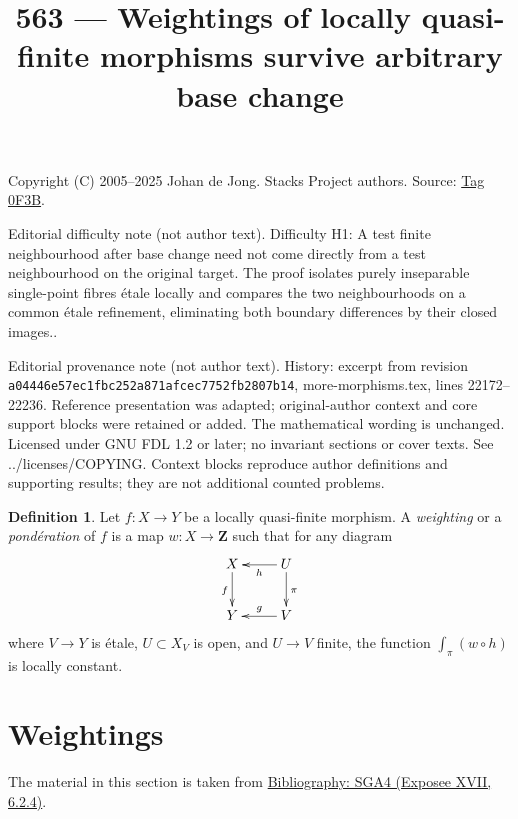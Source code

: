 \documentclass{amsart}
\theoremstyle{plain}
\theoremstyle{definition}
\newtheorem{definition}[subsection]{Definition}
\theoremstyle{remark}
\numberwithin{equation}{subsection}
\begin{document}
\title[Stacks Project, Tag 0F3B]{563 --- Weightings of locally quasi-finite morphisms survive arbitrary base change}
\maketitle
\noindent Copyright (C) 2005--2025 Johan de Jong. Stacks Project authors. Source: \href{https://stacks.math.columbia.edu/tag/0F3B}{Tag 0F3B}.

\noindent Editorial difficulty note (not author text). Difficulty H1: A test finite neighbourhood after base change need not come directly from a test neighbourhood on the original target. The proof isolates purely inseparable single-point fibres étale locally and compares the two neighbourhoods on a common étale refinement, eliminating both boundary differences by their closed images..

\noindent Editorial provenance note (not author text). History: excerpt from revision \texttt{a0444\allowbreak 6e57e\allowbreak c1fbc\allowbreak 252a8\allowbreak 71afc\allowbreak ec775\allowbreak 2fb28\allowbreak 07b14}, more-morphisms.tex, lines 22172--22236. Reference presentation was adapted; original-author context and core support blocks were retained or added. The mathematical wording is unchanged. Licensed under GNU FDL 1.2 or later; no invariant sections or cover texts. See ../licenses/COPYING. Context blocks reproduce author definitions and supporting results; they are not additional counted problems.

\begin{definition}
\label{definition-weighting}
Let $f : X \to Y$ be a locally quasi-finite morphism. A
{\it weighting} or a {\it pond\'eration} of $f$ is a map
$w : X \to \mathbf{Z}$ such that for any diagram
$$
\xymatrix{
X \ar[d]_f & U \ar[l]^h \ar[d]^\pi \\
Y & V \ar[l]_g
}
$$
where $V \to Y$ is \'etale, $U \subset X_V$ is open, and $U \to V$ finite,
the function $\int_\pi (w \circ h)$ is locally constant.
\end{definition}

\section{Weightings}
\label{section-weightings}

\noindent
The material in this section is taken from \href{https://stacks.math.columbia.edu/bibliography}{Bibliography: SGA4 (Exposee XVII, 6.2.4)}.
\end{document}
